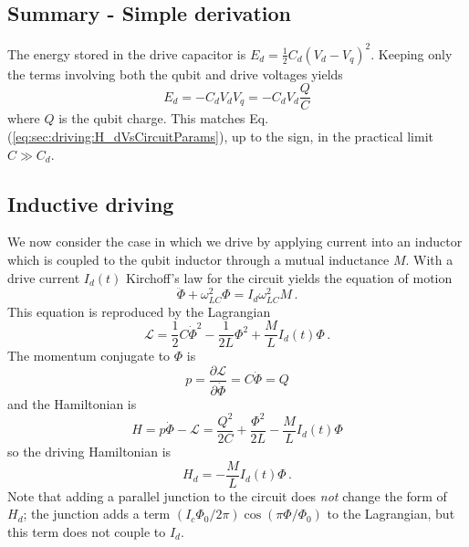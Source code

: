 \subsection{Summary - Simple derivation}

The energy stored in the drive capacitor is $E_d = \frac{1}{2}C_d\left( V_d - V_q \right)^2$.
Keeping only the terms involving both the qubit and drive voltages yields \begin{equation}
E_d = - C_d V_d V_q = - C_d V_d \frac{Q}{C} \end{equation}
where $Q$ is the qubit charge.
This matches Eq.\,(\ref{eq:sec:driving:H_dVsCircuitParams}), up to the sign, in the practical limit $C \gg C_d$.


\subsection{Inductive driving}

We now consider the case in which we drive by applying current into an inductor which is coupled to the qubit inductor through a mutual inductance $M$.
With a drive current $I_d(t)$ Kirchoff's law for the circuit yields the equation of motion
\begin{equation}
\ddot{\Phi} + \omega_{LC}^2 \Phi = I_d \omega_{LC}^2 M \, .
\end{equation}
This equation is reproduced by the Lagrangian
\begin{equation}
\mathcal{L} = \frac{1}{2}C \dot{\Phi}^2 - \frac{1}{2L} \Phi^2 + \frac{M}{L}I_d(t) \Phi \, .
\end{equation}
The momentum conjugate to $\Phi$ is
\begin{equation}
p = \frac{\partial \mathcal{L}}{\partial \dot{\Phi}} = C \dot{\Phi} = Q
\end{equation}
and the Hamiltonian is
\begin{equation}
H = p \dot{\Phi} - \mathcal{L} = \frac{Q^2}{2C} + \frac{\Phi^2}{2L} - \frac{M}{L} I_d(t) \Phi
\end{equation}
so the driving Hamiltonian is
\begin{equation}
H_d = - \frac{M}{L}I_d(t) \Phi \, .
\end{equation}
Note that adding a parallel junction to the circuit does \emph{not} change the form of $H_d$; the junction adds a term $(I_c \Phi_0 / 2\pi)\cos(\pi \Phi / \Phi_0)$ to the Lagrangian, but this term does not couple to $I_d$.

